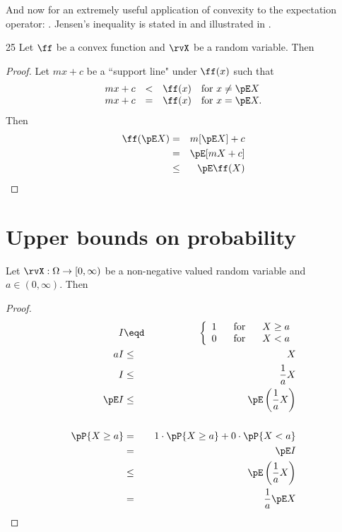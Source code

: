 And now for an extremely useful application of convexity to the
expectation operator: .
Jensen's inequality is stated in 
and illustrated in .
\begin{theorem}
\citep{cover}{25}
\label{thm:jensen}
Let $\ff$ be a convex function and $\rvX$ be a random variable. Then
\end{theorem}
\begin{proof}
Let $mx+c$ be a ``support line" under $\ff(x)$ such that
\[
  \begin{array}{rcll}
    mx+c &<& \ff(x) & \mbox{for } x\ne \pE X \\
    mx+c &=& \ff(x) & \mbox{for } x=\pE X.
  \end{array}
\]
Then
\begin{eqnarray*}
  \ff(\pE X)
    &=&   m[\pE X] + c
  \\&=&   \pE[mX + c]
  \\&\le& \pE\ff(X)
\end{eqnarray*}
\end{proof}


\section{Upper bounds on probability}
\begin{theorem}
Let $\rvX:\Omega\to[0,\infty)$ be a non-negative valued random variable and
$a\in(0,\infty)$. Then
\end{theorem}
\begin{proof}
\begin{eqnarray*}
  I &\eqd& \left\{ \begin{array}{l@{\hspace{4ex}\mbox{for}\hspace{4ex}}l}
    1 & X\ge a \\
    0 & X < a
    \end{array}\right.
\\
  aI &\le& X           \\
   I &\le& \frac{1}{a} X \\
   \pE I &\le& \pE\left(\frac{1}{a} X\right) \\
\\
   \pP{X\ge a}
     &=& 1\cdot\pP{X\ge a} + 0\cdot\pP{X<a}
   \\&=& \pE I
   \\&\le& \pE\left(\frac{1}{a} X \right)
   \\&=&   \frac{1}{a}\pE X
\end{eqnarray*}
\end{proof}


